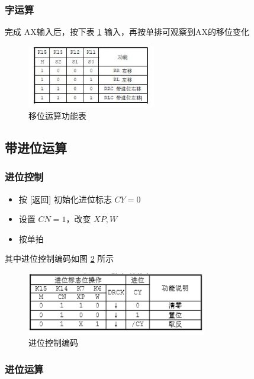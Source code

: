 \documentclass[a4paper,10pt,UTF8]{paper}
\numberwithin{equation}{section}
\numberwithin{figure}{section}
\begin{document}
\subsubsection{字运算}

完成 AX输入后，按下表 \ref{fig:shiftfunc} 输入，再按单排可观察到AX的移位变化

\begin{figure}[h]
  \centering
  \includegraphics[width=0.5\textwidth]{5.jpg}
  \caption{移位运算功能表}
  \label{fig:shiftfunc}
\end{figure}


\subsection{带进位运算}

\subsubsection{进位控制}

\begin{itemize}
  \item 按 [返回] 初始化进位标志 $CY=0$
  \item 设置 $CN=1$，改变 $XP,W$
  \item 按单拍
\end{itemize}

其中进位控制编码如图 \ref{fig:cycode} 所示


\begin{figure}[h]
  \centering
  \includegraphics[width=0.7\textwidth]{3.PNG}
  \caption{进位控制编码}
  \label{fig:cycode}
\end{figure}

\subsubsection{进位运算}
\end{document}
